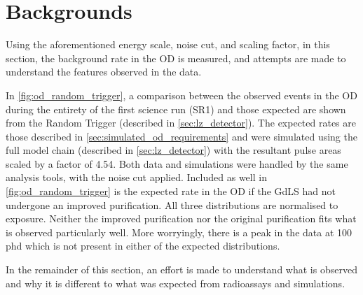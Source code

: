 \section{Backgrounds}
\label{sec:od_analysis_backgrounds}
\par
Using the aforementioned energy scale, noise cut, and scaling factor, in this section, the background rate in the OD is measured, and attempts are made to understand the features observed in the data.
\par
In \autoref{fig:od_random_trigger}, a comparison between the observed events in the OD during the entirety of the first science run (SR1) and those expected are shown from the Random Trigger (described in \autoref{sec:lz_detector}).
The expected rates are those described in \autoref{sec:simulated_od_requirements} and were simulated using the full model chain (described in \autoref{sec:lz_detector}) with the resultant pulse areas scaled by a factor of 4.54.
Both data and simulations were handled by the same analysis tools, with the noise cut applied.
Included as well in \autoref{fig:od_random_trigger} is the expected rate in the OD if the GdLS had not undergone an improved purification.
All three distributions are normalised to exposure.
Neither the improved purification nor the original purification fits what is observed particularly well.
More worryingly, there is a peak in the data at 100 phd which is not present in either of the expected distributions.
\par
In the remainder of this section, an effort is made to understand what is observed and why it is different to what was expected from radioassays and simulations.




